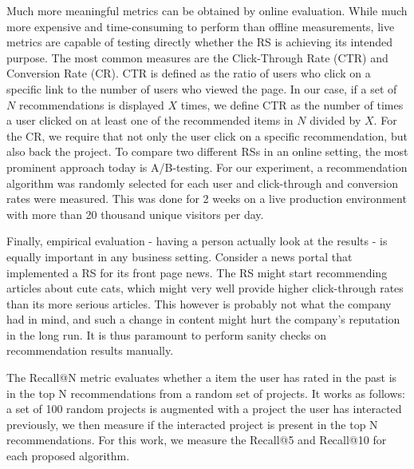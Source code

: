 \documentclass[cic,tc,english]{iiufrgs}
\begin{document}
Much more meaningful metrics can be obtained by online evaluation. While much more expensive and time-consuming to perform than offline measurements, live metrics are capable of testing directly whether the RS is achieving its intended purpose. The most common measures are the Click-Through Rate (CTR) and Conversion Rate (CR). CTR is defined as the ratio of users who click on a specific link to the number of users who viewed the page. In our case, if a set of $N$ recommendations is displayed $X$ times, we define CTR as the number of times a user clicked on at least one of the recommended items in $N$ divided by $X$. For the CR, we require that not only the user click on a specific recommendation, but also back the project. To compare two different RSs in an online setting, the most prominent approach today is A/B-testing. For our experiment, a recommendation algorithm was randomly selected for each user and click-through and conversion rates were measured. This was done for 2 weeks on a live production environment with more than 20 thousand unique visitors per day.

Finally, empirical evaluation - having a person actually look at the results - is equally important in any business setting. Consider a news portal that implemented a RS for its front page news. The RS might start recommending articles about cute cats, which might very well provide higher click-through rates than its more serious articles. This however is probably not what the company had in mind, and such a change in content might hurt the company's reputation in the long run. It is thus paramount to perform sanity checks on recommendation results manually. 


The Recall@N metric evaluates whether a item the user has rated in the past is in the top N recommendations from a random set of projects. It works as follows: a set of 100 random projects is augmented with a project the user has interacted previously, we then measure if the interacted project is present in the top N recommendations. For this work, we measure the Recall@5 and Recall@10 for each proposed algorithm.

\end{document}
